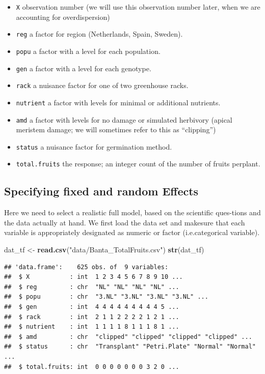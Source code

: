 \documentclass[
  12pt,
]{book}
\newenvironment{Shaded}{\begin{snugshade}}{\end{snugshade}}
\newcommand{\KeywordTok}[1]{\textcolor[rgb]{0.13,0.29,0.53}{\textbf{#1}}}
\newcommand{\NormalTok}[1]{#1}
\newcommand{\StringTok}[1]{\textcolor[rgb]{0.31,0.60,0.02}{#1}}
\providecommand{\tightlist}{%
  \setlength{\itemsep}{0pt}\setlength{\parskip}{0pt}}
\begin{document}
\begin{itemize}
\tightlist
\item
  \texttt{X} observation number (we will use this observation number later, when we are accounting for overdispersion)
\item
  \texttt{reg} a factor for region (Netherlands, Spain, Sweden).
\item
  \texttt{popu} a factor with a level for each population.
\item
  \texttt{gen} a factor with a level for each genotype.
\item
  \texttt{rack} a nuisance factor for one of two greenhouse racks.
\item
  \texttt{nutrient} a factor with levels for minimal or additional nutrients.
\item
  \texttt{amd} a factor with levels for no damage or simulated herbivory (apical meristem damage; we will sometimes refer to this as ``clipping'')
\item
  \texttt{status} a nuisance factor for germination method.
\item
  \texttt{total.fruits} the response; an integer count of the number of fruits perplant.
\end{itemize}

\hypertarget{specifying-fixed-and-random-effects}{%
\subsection{Specifying fixed and random Effects}\label{specifying-fixed-and-random-effects}}

Here we need to select a realistic full model, based on the scientific ques-tions and the data actually at hand. We first load the data set and makesure that each variable is appropriately designated as numeric or factor (i.e.categorical variable).

\begin{Shaded}
\begin{Highlighting}[]
\NormalTok{dat\_tf \textless{}{-}}\StringTok{ }\KeywordTok{read.csv}\NormalTok{(}\StringTok{"data/Banta\_TotalFruits.csv"}\NormalTok{)}
\KeywordTok{str}\NormalTok{(dat\_tf)}
\end{Highlighting}
\end{Shaded}

\begin{verbatim}
## 'data.frame':    625 obs. of  9 variables:
##  $ X           : int  1 2 3 4 5 6 7 8 9 10 ...
##  $ reg         : chr  "NL" "NL" "NL" "NL" ...
##  $ popu        : chr  "3.NL" "3.NL" "3.NL" "3.NL" ...
##  $ gen         : int  4 4 4 4 4 4 4 4 4 5 ...
##  $ rack        : int  2 1 1 2 2 2 2 1 2 1 ...
##  $ nutrient    : int  1 1 1 1 8 1 1 1 8 1 ...
##  $ amd         : chr  "clipped" "clipped" "clipped" "clipped" ...
##  $ status      : chr  "Transplant" "Petri.Plate" "Normal" "Normal" ...
##  $ total.fruits: int  0 0 0 0 0 0 0 3 2 0 ...
\end{verbatim}
\end{document}

